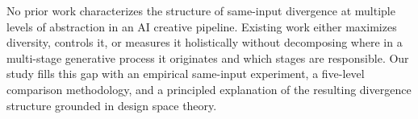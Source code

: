 No prior work characterizes the structure of same-input divergence at multiple levels of abstraction in an AI creative pipeline. Existing work either maximizes diversity, controls it, or measures it holistically without decomposing where in a multi-stage generative process it originates and which stages are responsible. Our study fills this gap with an empirical same-input experiment, a five-level comparison methodology, and a principled explanation of the resulting divergence structure grounded in design space theory.
